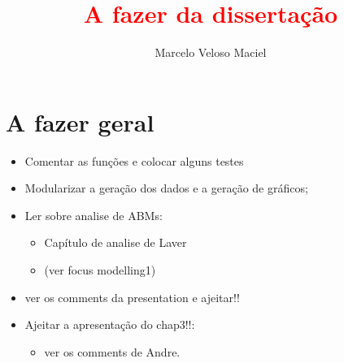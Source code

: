 \documentclass{article}
\title{\textcolor{red}{A fazer da dissertação}}
\author{Marcelo Veloso Maciel}
\date{}
\begin{document}
\pagecolor{base03}
\color{base1}

\maketitle


\section*{A fazer geral}
\begin{itemize}
\item Comentar as funções e colocar alguns testes
\item Modularizar a geração dos dados e a geração de gráficos;
\item Ler sobre analise de ABMs:
  \begin{itemize}
  \item Capítulo de analise de Laver
  \item (ver focus modelling1)
  \end{itemize}
  \item ver os comments da presentation e ajeitar!!
  \item Ajeitar a apresentação do chap3!!:
    \begin{itemize}
    \item ver os comments de Andre.
    \end{itemize}
\end{itemize}
\end{document}

